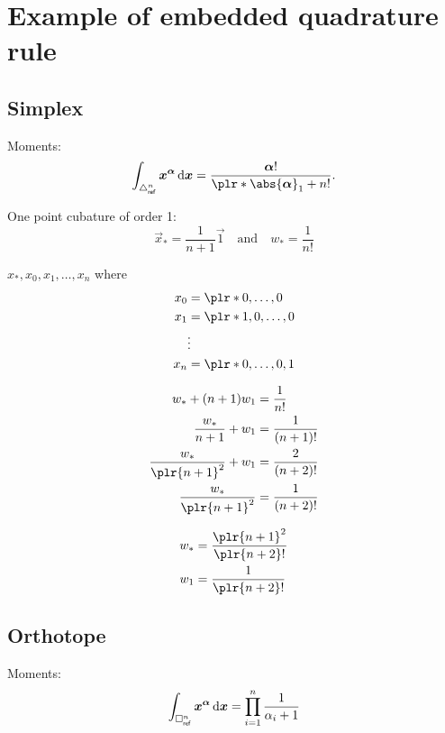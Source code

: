 
\section{Example of embedded quadrature rule}

\subsection{Simplex}

Moments:
\[
    \int_{\Simplex_\Rf^n} \vec{x}^{\vec{\alpha}} \di{\vec{x}} = \frac{\vec{\alpha}!}{\plr*{\abs{\vec{\alpha}}_1 + n}!}.
\]

One point cubature of order 1:
\[
    \vec{x}_* = \frac{1}{n+1} \vec{1}
    \quad \text{and} \quad
    w_* = \frac{1}{n!}
\]

\( x_*, x_0, x_1, \ldots, x_n \) where
\begin{align*}
    x_0 & = \plr*{0, \ldots, 0}
    \\
    x_1 & = \plr*{1, 0, \ldots, 0}
    \\
        & \vdots
    \\
    x_n & = \plr*{0, \ldots, 0, 1}
\end{align*}

\begin{align*}
    w_* + (n+1) w_1               & = \frac{1}{n!}
    \\
    \frac{w_*}{n+1} + w_1         & = \frac{1}{(n+1)!}
    \\
    \frac{w_*}{\plr{n+1}^2} + w_1 & = \frac{2}{(n+2)!}
    \\
    \frac{w_*}{\plr{n+1}^2}       & = \frac{1}{(n+2)!}
\end{align*}

\begin{align*}
    w_* & = \frac{\plr{n+1}^2}{\plr{n+2}!}
    \\
    w_1 & = \frac{1}{\plr{n+2}!}
\end{align*}

\subsection{Orthotope}

Moments:
\[
    \int_{\square_{\mathsf{ref}}^n} \bm{x}^{\bm{\alpha}} \mathop{}\!\mathrm{d}\bm{x} = \prod_{i=1}^n \frac{1}{\alpha_i + 1}
\]

